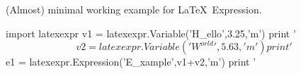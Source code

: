 \documentclass[12pt]{report}
\begin{document}
(Almost) minimal working example for \LaTeX\ Expression.
\begin{python}
import latexexpr
v1 = latexexpr.Variable('H_{ello}',3.25,'m')
print '$$ %
v2 = latexexpr.Variable('W^{orld}',5.63,'m')
print '$$ %
e1 = latexexpr.Expression('E_{xample}',v1+v2,'m')
print '$$ %
\end{python}
\end{document}
